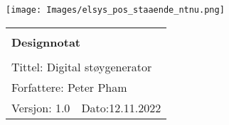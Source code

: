 \begin{minipage}[c]{0.15\textwidth}
\texttt{[image: Images/elsys\_pos\_staaende\_ntnu.png]}
\end{minipage}
\begin{minipage}[c]{0.80\textwidth}

\renewcommand{\arraystretch}{1.7}
\large 
\begin{tabularx}{\textwidth}{|X|X|}
\hline
\multicolumn{2}{|l|}{} \\
\multicolumn{2}{|l|}{\huge \textbf{Designnotat}} \\
\multicolumn{2}{|l|}{}  \\
\hline
\multicolumn{2}{|l|}{Tittel: 
Digital støygenerator
} \\
\hline
\multicolumn{2}{|l|}{Forfattere: 
Peter Pham
} \\
\hline
Versjon: 1.0 & Dato:12.11.2022
\\
\hline 
\end{tabularx}
\end{minipage}
\normalsize


